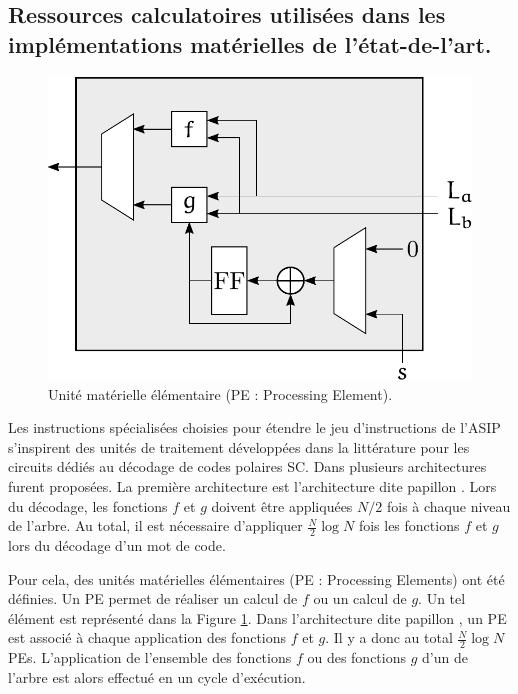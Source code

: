 \subsection{Ressources calculatoires utilisées dans les implémentations matérielles de l'état-de-l'art.}
\label{subsec:hard_sc}

\begin{figure}[t]
\centering
\includegraphics[scale=0.75]{main/ch3_fig/PE}
\caption{Unité matérielle élémentaire (PE : Processing Element).}
\label{fig:pe}
\end{figure}


Les instructions spécialisées choisies pour étendre le jeu d'instructions de l'ASIP s'inspirent des unités de traitement développées dans la littérature pour les circuits dédiés au décodage de codes polaires SC. Dans \cite{leroux_hardware_2011} plusieurs architectures furent proposées. La première architecture est l'architecture dite \og papillon \fg. Lors du décodage, les fonctions $f$ et $g$ doivent être appliquées $N/2$ fois à chaque niveau de l'arbre. Au total, il est nécessaire d'appliquer $\frac{N}{2} \log N$ fois les fonctions $f$ et $g$ lors du décodage d'un mot de code. 

Pour cela, des unités matérielles élémentaires (PE : Processing Elements) ont été définies.
Un PE permet de réaliser un calcul de $f$ ou un calcul de $g$. Un tel élément est représenté dans la Figure \ref{fig:pe}.
Dans l'architecture dite \og papillon \fg, un PE est associé à chaque application des fonctions $f$ et $g$.
Il y a donc au total $\frac{N}{2} \log N$ PEs.
L'application de l'ensemble des fonctions $f$ ou des fonctions $g$ d'un \noeud de l'arbre est alors effectué en un cycle d'exécution.

